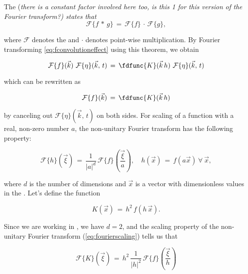 The  \citep{temp} (\textit{there is a constant factor involved here too, is this 1 for this version of the Fourier transform?) states that
}
\begin{equation} \label{eq:convolutiontheorem}
\mathcal{F}\{f\,*\,g\} \,=\, \mathcal{F}\{f\}\,\cdot\,\mathcal{F}\{g\},
\end{equation}

where $\mathcal{F}$ denotes the  and $\cdot$ denotes point-wise multiplication. By Fourier transforming \eqref{eq:fconvolutioneffect} using this theorem, we obtain

\begin{equation}
\mathcal{F}\{f\}(\vec{k})\ \mathcal{F}\{\eta\}(\vec{k},\,t) \,=\, \fdfunc{K}(\vec{k}\,h)\ \mathcal{F}\{\eta\}(\vec{k},\,t)
\end{equation}

which can be rewritten as

\begin{equation} \label{eq:ffourier}
\mathcal{F}\{f\}(\vec{k}) \,=\, \fdfunc{K}(\vec{k}\,h)
\end{equation}

by canceling out $\mathcal{F}\{\eta\}(\vec{k},\,t)$ on both sides. For scaling of a function with a real, non-zero number $a$, the non-unitary Fourier transform has the following property:

\begin{equation} \label{eq:fourierscaling}
\mathcal{F}\{h\}(\vec{\xi}) \,=\, \frac{1}{|a|^d}\,\mathcal{F}\{f\}\left(\frac{\vec{\xi}}{a}\right)
,\quad
h(\vec{x}) \,=\, f(a\vec{x})\ \forall\ \vec{x},
\end{equation}

where $d$ is the number of dimensions and $\vec{x}$ is a vector with dimensionless values in the . Let's define the function

\begin{equation} \label{eq:ftokernel}
K(\vec{x}) \,=\, h^2\,f(h\,\vec{x}).
\end{equation}

Since we are working in , we have $d = 2$, and the scaling property of the non-unitary Fourier transform (\eqref{eq:fourierscaling}) tells us that

\begin{equation}
\mathcal{F}\{K\}(\vec{\xi}) \,=\, h^2\,\frac{1}{|h|^2}\,\mathcal{F}\{f\}\left(\frac{\vec{\xi}}{h}\right)
\end{equation}


